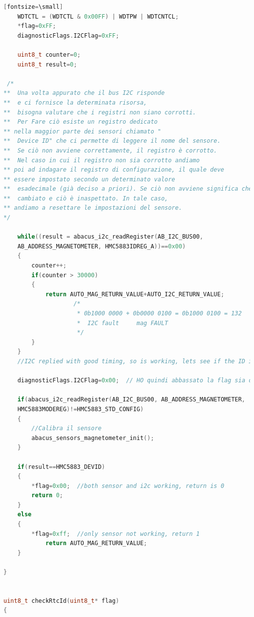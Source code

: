 \documentclass[LaM,binding=0.6cm]{../sapthesis}
\begin{document}
\begin{lstlisting}[language=c][fontsize=\small]
    WDTCTL = (WDTCTL & 0x00FF) | WDTPW | WDTCNTCL;
    *flag=0xFF;
    diagnosticFlags.I2CFlag=0xFF;

    uint8_t counter=0;
    uint8_t result=0;
    
 /*
**  Una volta appurato che il bus I2C risponde 
**  e ci fornisce la determinata risorsa, 
**  bisogna valutare che i registri non siano corrotti.
**  Per Fare ciò esiste un registro dedicato 
** nella maggior parte dei sensori chiamato "
**  Device ID" che ci permette di leggere il nome del sensore.
**  Se ciò non avviene correttamente, il registro è corrotto.
**  Nel caso in cui il registro non sia corrotto andiamo 
** poi ad indagare il registro di configurazione, il quale deve 
** essere impostato secondo un determinato valore
**  esadecimale (già deciso a priori). Se ciò non avviene significa che qualcosa è
**  cambiato e ciò è inaspettato. In tale caso, 
** andiamo a resettare le impostazioni del sensore.
*/

    while((result = abacus_i2c_readRegister(AB_I2C_BUS00, 
    AB_ADDRESS_MAGNETOMETER, HMC5883IDREG_A))==0x00)
    {
        counter++;
        if(counter > 30000)             
        {
            return AUTO_MAG_RETURN_VALUE+AUTO_I2C_RETURN_VALUE;
                    /*
                     * 0b1000 0000 + 0b0000 0100 = 0b1000 0100 = 132
                     *  I2C fault     mag FAULT
                     */
        }
    }
    //I2C replied with good timing, so is working, lets see if the ID is correct

    diagnosticFlags.I2CFlag=0x00;  // HO quindi abbassato la flag sia del sensore che del bus

    if(abacus_i2c_readRegister(AB_I2C_BUS00, AB_ADDRESS_MAGNETOMETER, 
    HMC5883MODEREG)!=HMC5883_STD_CONFIG)
    {
        //Calibra il sensore
        abacus_sensors_magnetometer_init();
    }

    if(result==HMC5883_DEVID)
    {
        *flag=0x00;  //both sensor and i2c working, return is 0
        return 0;
    }
    else
    {
        *flag=0xff;  //only sensor not working, return 1
            return AUTO_MAG_RETURN_VALUE;
    }

}


uint8_t checkRtcId(uint8_t* flag)
{


\end{lstlisting}
\end{document}
